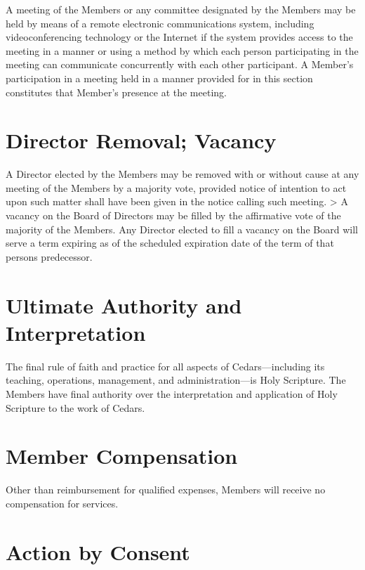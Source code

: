 \documentclass[
]{book}
\begin{document}
A meeting of the Members or any committee designated by the Members
may be held by means of a remote electronic communications system,
including videoconferencing technology or the Internet if the system
provides access to the meeting in a manner or using a method by which
each person participating in the meeting can communicate concurrently
with each other participant. A Member's participation in a meeting
held in a manner provided for in this section constitutes that
Member's presence at the meeting.

\section{Director Removal; Vacancy}\label{director-removal-vacancy}

A Director elected by the Members may be removed with or without cause
at any meeting of the Members by a majority vote, provided notice of
intention to act upon such matter shall have been given in the notice
calling such meeting.
\textgreater{}
A vacancy on the Board of Directors may be filled by the affirmative
vote of the majority of the Members. Any Director elected to fill a
vacancy on the Board will serve a term expiring as of the scheduled
expiration date of the term of that person\textquotesingle s predecessor.

\section{Ultimate Authority and Interpretation}\label{ultimate-authority-and-interpretation}

The final rule of faith and practice for all aspects of
Cedars---including its teaching, operations, management, and
administration---is Holy Scripture. The Members have final authority
over the interpretation and application of Holy Scripture to the work
of Cedars.

\section{Member Compensation}\label{member-compensation}

Other than reimbursement for qualified expenses, Members will receive
no compensation for services.

\section{Action by Consent}\label{action-by-consent}
\end{document}
